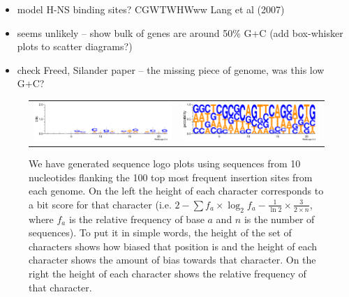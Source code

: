 \documentclass[12pt,letterpaper]{article}
\begin{document}
\begin{itemize}
\item model H-NS binding sites? CGWTWHWww Lang et al (2007)
\item seems unlikely -- show bulk of genes are around 50\% G+C (add box-whisker plots to scatter diagrams?)
\item check Freed, Silander paper -- the missing piece of genome, was this low G+C? 
\end{itemize}

\begin{figure}
\begin{tabular}{c c}
\includegraphics[scale=0.55]{100logo-bits.pdf}&
\includegraphics[scale=0.55]{100logo-prob.pdf}
\end{tabular}
\caption{We have generated sequence logo plots using sequences from 10 nucleotides flanking the 100 top most frequent insertion sites from each genome. On the left the height of each character corresponds to a bit score for that character (i.e. $2-\sum f_a\times\log_2f_a-\frac{1}{\ln2}\times\frac{3}{2\times n}$, where $f_a$ is the relative frequency of base $a$ and $n$ is the number of sequences). To put it in simple words, the height of the set of characters shows how biased that position is and the height of each character shows the amount of bias towards that character. On the right the height of each character shows the relative frequency of that character.}
\label{fig:logos}
\end{figure}
\end{document}

